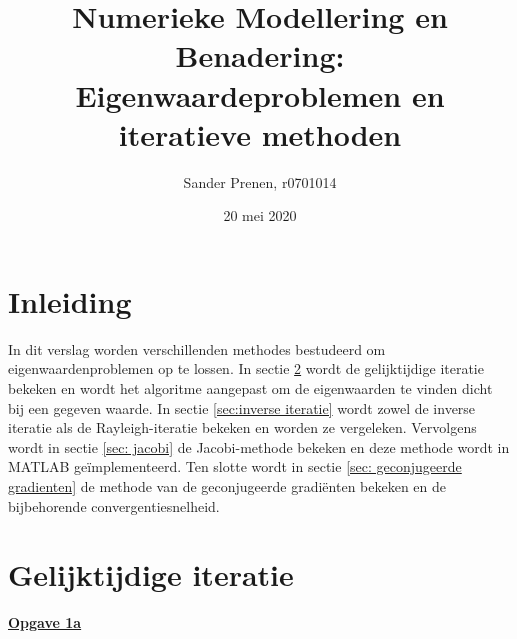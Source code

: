 \documentclass[a4paper, 12pt, titlepage, fleqn]{article}
\begin{document}
\title{\textbf{Numerieke Modellering en Benadering: Eigenwaardeproblemen en iteratieve methoden}}
\author{Sander Prenen, r0701014}

\date{20 mei 2020}
\begin{titlepage}
	\maketitle
	\thispagestyle{empty}
\end{titlepage}

\newpage
\tableofcontents
\listoffigures
\newpage

\section{Inleiding}
In dit verslag worden verschillenden methodes bestudeerd om eigenwaardenproblemen op te lossen. In sectie \ref{sec:gelijktijdige iteratie} wordt de gelijktijdige iteratie bekeken en wordt het algoritme aangepast om de eigenwaarden te vinden dicht bij een gegeven waarde. In sectie \ref{sec:inverse iteratie} wordt zowel de inverse iteratie als de Rayleigh-iteratie bekeken en worden ze vergeleken. Vervolgens wordt in sectie \ref{sec: jacobi} de Jacobi-methode bekeken en deze methode wordt in MATLAB ge\"implementeerd. Ten slotte wordt in sectie \ref{sec: geconjugeerde gradienten} de methode van de geconjugeerde gradi\"enten bekeken en de bijbehorende convergentiesnelheid.

\section{Gelijktijdige iteratie}\label{sec:gelijktijdige iteratie}
\underline{\textbf{Opgave 1a}}\\
\end{document}
